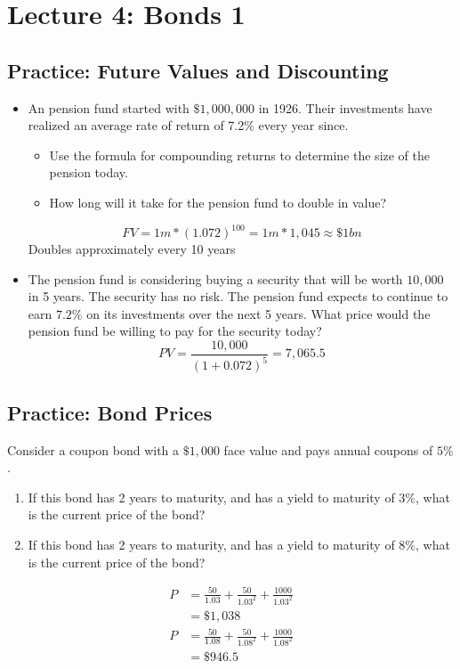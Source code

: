 \documentclass[11pt]{article}
\theoremstyle{definition}
\begin{document}
\section{Lecture 4: Bonds 1}

\subsection{Practice: Future Values and Discounting}

    \begin{shaded}
    \begin{itemize}
    \item An pension fund started with $\$1,000,000$ in 1926.   Their investments have realized an average rate of return of 7.2\% every year since.  
    \begin{itemize}
        \item Use the formula for compounding returns to determine the size of the pension today.
        \item How long will it take for the pension fund to double in value?
    \end{itemize}
    $$FV = 1m*(1.072)^{100} = 1m*1,045 \approx \$1bn$$
    Doubles approximately every 10 years
    
    \item The pension fund is considering buying a security that will be worth $10,000$ in 5 years.  The security has no risk.   The pension fund expects to continue to earn $7.2\%$ on its investments over the next 5 years.   What price would the pension fund be willing to pay for the security today? 
    $$PV = \frac{10,000}{(1+0.072)^{5}} = 7,065.5$$
    \end{itemize}
    \end{shaded}

    \subsection{Practice: Bond Prices}
        \begin{shaded}
            Consider a coupon bond with a $\$1,000$ face value and pays annual coupons of $5\%$. 
        \begin{enumerate}
        \item If this bond has 2 years to maturity, and has a yield to maturity of $3\%$, what is the current price of the bond?
        \item If this bond has 2 years to maturity, and has a yield to maturity of $8\%$, what is the current price of the bond?
        \end{enumerate}

        \begin{align*}
            P &= \frac{50}{1.03} + \frac{50}{1.03^2} + \frac{1000}{1.03^2}\\
            &= \$1,038\\
        P &= \frac{50}{1.08} + \frac{50}{1.08^2} + \frac{1000}{1.08^2}\\
            &= \$946.5
        \end{align*}
        
        \end{shaded}
\end{document}
